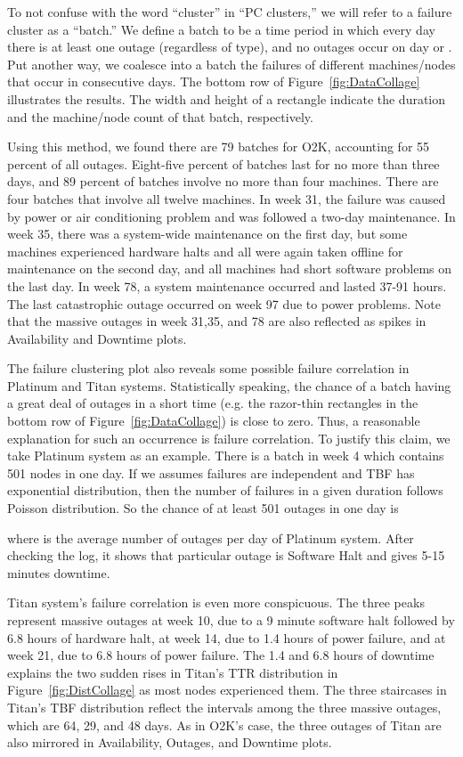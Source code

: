 \documentclass[10pt,twocolumn]{article}
\begin{document}
To not confuse with the word ``cluster'' in ``PC 
clusters,'' we will refer to a failure cluster as 
a ``batch.'' We define a batch to be a time 
period  in which every day there is 
at least one outage (regardless of type), and 
no outages occur on day  or . 
Put another way, we coalesce into a batch the 
failures of different machines/nodes that occur 
in consecutive days. The bottom row of
Figure~\ref{fig:DataCollage} illustrates the 
results. The width and height of a rectangle
indicate the duration and the machine/node count
of that batch, respectively.

Using this method, we found there are 79 batches 
for O2K, accounting for 55 percent of all outages. 
Eight-five percent of batches last for no more than 
three days, and 89 percent of batches involve no
more than four machines. There are four batches
that involve all twelve machines. In week 31, the
failure was caused by power or air conditioning
problem and was followed a two-day maintenance.
In week 35, there was a system-wide maintenance 
on the first day, but some machines experienced 
hardware halts and all were again taken offline for 
maintenance on the second day, and all machines 
had short software problems on the last day. In week
78, a system maintenance occurred and lasted 37-91 
hours. The last catastrophic outage occurred on 
week 97 due to power problems. Note that the massive
outages in week 31,35, and 78 are also reflected
as spikes in Availability and Downtime plots.

The failure clustering plot also reveals some 
possible failure correlation in Platinum and 
Titan systems. Statistically speaking, the chance
of a batch having a great deal of outages in a 
short time (e.g. the razor-thin rectangles in 
the bottom row of Figure~\ref{fig:DataCollage}) is 
close to zero. Thus, a reasonable explanation for such 
an occurrence is failure correlation. To justify this 
claim, we take Platinum system as an example. There is 
a batch in week 4 which contains 501 nodes in one day. 
If we assumes failures are independent and TBF 
has exponential distribution, then the number of
failures in a given duration follows Poisson distribution.
So the chance of at least 501 outages in 
one day is 

where  is the average number of outages per day
of Platinum system. After checking the log, it
shows that particular outage is Software Halt and gives
5-15 minutes downtime.

Titan system's failure correlation is even more
conspicuous. The three peaks represent massive
outages at week 10, due to a 9 minute software halt
followed by 6.8 hours of hardware halt, at week
14, due to 1.4 hours of power failure, and at week
21, due to 6.8 hours of power failure. The 1.4 and
6.8 hours of downtime explains the two sudden rises
in Titan's TTR distribution in Figure~\ref{fig:DistCollage}
as most nodes experienced them.
The three staircases in Titan's TBF distribution reflect
the intervals among the three massive outages, which
are 64, 29, and 48 days. As in O2K's case, the three
outages of Titan are also mirrored in Availability, 
Outages, and Downtime plots.
\end{document}
